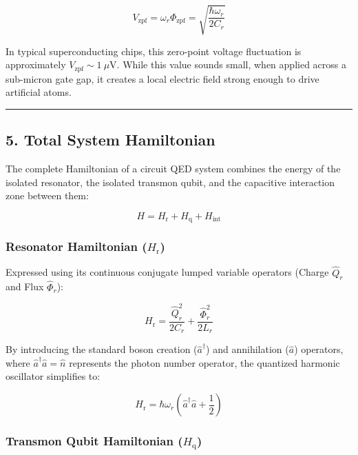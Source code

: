 \documentclass[
]{article}
\begin{document}
\[V_{\text{zpf}} = \omega_r \Phi_{\text{zpf}} = \sqrt{\frac{\hbar \omega_r}{2 C_r}}\]

In typical superconducting chips, this zero-point voltage fluctuation is
approximately \(V_{\text{zpf}} \sim 1\ \mu\text{V}\). While this value
sounds small, when applied across a sub-micron gate gap, it creates a
local electric field strong enough to drive artificial atoms.

\begin{center}\rule{0.5\linewidth}{0.5pt}\end{center}

\subsection{5. Total System Hamiltonian}\label{total-system-hamiltonian}

The complete Hamiltonian of a circuit QED system combines the energy of
the isolated resonator, the isolated transmon qubit, and the capacitive
interaction zone between them:

\[H = H_{\text{r}} + H_{\text{q}} + H_{\text{int}}\]

\subsubsection{\texorpdfstring{Resonator Hamiltonian
(\(H_{\text{r}}\))}{Resonator Hamiltonian (H\_\{\textbackslash text\{r\}\})}}\label{resonator-hamiltonian-h_textr}

Expressed using its continuous conjugate lumped variable operators
(Charge \(\hat{Q}_r\) and Flux \(\hat{\Phi}_r\)):

\[H_{\text{r}} = \frac{\hat{Q}_r^2}{2C_r} + \frac{\hat{\Phi}_r^2}{2L_r}\]

By introducing the standard boson creation (\(\hat{a}^\dagger\)) and
annihilation (\(\hat{a}\)) operators, where
\(\hat{a}^\dagger \hat{a} = \hat{n}\) represents the photon number
operator, the quantized harmonic oscillator simplifies to:

\[H_{\text{r}} = \hbar \omega_r \left( \hat{a}^\dagger \hat{a} + \frac{1}{2} \right)\]

\subsubsection{\texorpdfstring{Transmon Qubit Hamiltonian
(\(H_{\text{q}}\))}{Transmon Qubit Hamiltonian (H\_\{\textbackslash text\{q\}\})}}\label{transmon-qubit-hamiltonian-h_textq}
\end{document}
